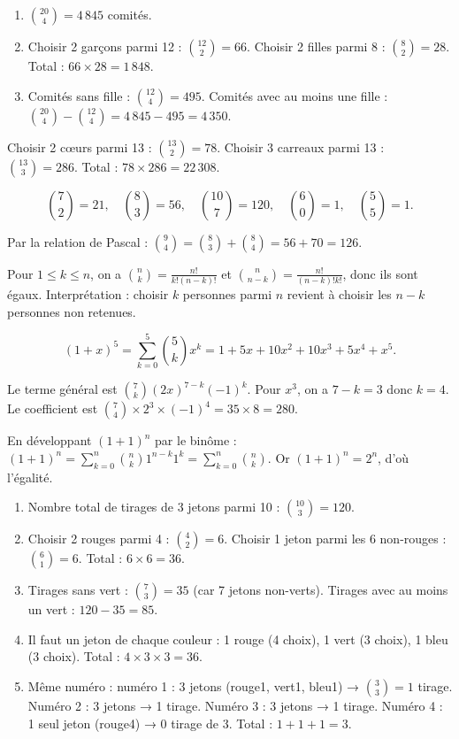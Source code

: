 \begin{enumerate}[label=\alph*)]
    \item $\binom{20}{4} = 4\,845$ comités.
    \item Choisir 2 garçons parmi 12 : $\binom{12}{2}=66$. Choisir 2 filles parmi 8 : $\binom{8}{2}=28$. Total : $66 \times 28 = 1\,848$.
    \item Comités sans fille : $\binom{12}{4}=495$. Comités avec au moins une fille : $\binom{20}{4} - \binom{12}{4} = 4\,845 - 495 = 4\,350$.
\end{enumerate}

Choisir 2 cœurs parmi 13 : $\binom{13}{2}=78$. Choisir 3 carreaux parmi 13 : $\binom{13}{3}=286$. Total : $78 \times 286 = 22\,308$.

\[
\binom{7}{2}=21,\quad \binom{8}{3}=56,\quad \binom{10}{7}=120,\quad \binom{6}{0}=1,\quad \binom{5}{5}=1.
\]

Par la relation de Pascal : $\binom{9}{4} = \binom{8}{3} + \binom{8}{4} = 56 + 70 = 126$.

Pour $1 \le k \le n$, on a $\binom{n}{k} = \frac{n!}{k!(n-k)!}$ et $\binom{n}{n-k} = \frac{n!}{(n-k)!k!}$, donc ils sont égaux. Interprétation : choisir $k$ personnes parmi $n$ revient à choisir les $n-k$ personnes non retenues.

\[
(1+x)^5 = \sum_{k=0}^{5} \binom{5}{k} x^k = 1 + 5x + 10x^2 + 10x^3 + 5x^4 + x^5.
\]

Le terme général est $\binom{7}{k} (2x)^{7-k} (-1)^k$. Pour $x^3$, on a $7-k=3$ donc $k=4$. Le coefficient est $\binom{7}{4} \times 2^{3} \times (-1)^4 = 35 \times 8 = 280$.

En développant $(1+1)^n$ par le binôme : $(1+1)^n = \sum_{k=0}^{n} \binom{n}{k} 1^{n-k} 1^k = \sum_{k=0}^{n} \binom{n}{k}$. Or $(1+1)^n = 2^n$, d'où l'égalité.

\begin{enumerate}[label=\arabic*)]
    \item Nombre total de tirages de 3 jetons parmi 10 : $\binom{10}{3}=120$.
    \item Choisir 2 rouges parmi 4 : $\binom{4}{2}=6$. Choisir 1 jeton parmi les 6 non-rouges : $\binom{6}{1}=6$. Total : $6 \times 6 = 36$.
    \item Tirages sans vert : $\binom{7}{3}=35$ (car 7 jetons non-verts). Tirages avec au moins un vert : $120 - 35 = 85$.
    \item Il faut un jeton de chaque couleur : 1 rouge (4 choix), 1 vert (3 choix), 1 bleu (3 choix). Total : $4 \times 3 \times 3 = 36$.
    \item Même numéro : numéro 1 : 3 jetons (rouge1, vert1, bleu1) → $\binom{3}{3}=1$ tirage. Numéro 2 : 3 jetons → 1 tirage. Numéro 3 : 3 jetons → 1 tirage. Numéro 4 : 1 seul jeton (rouge4) → 0 tirage de 3. Total : $1+1+1=3$.
\end{enumerate}

